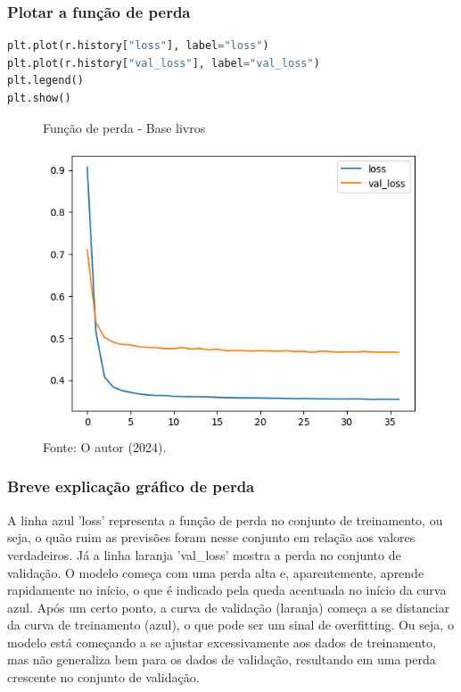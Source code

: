 \subsubsection*{Plotar a função de perda}
\begin{lstlisting}[language=Python, style=input]
plt.plot(r.history["loss"], label="loss")
plt.plot(r.history["val_loss"], label="val_loss")
plt.legend()
plt.show()
\end{lstlisting}
\begin{figure}[H]
\centering
\caption{Função de perda - Base livros}
\includegraphics[width=.8\linewidth]{apendices/fig/13_IAA012_9.png}
\caption*{Fonte: O autor (2024).}
\end{figure}
\subsubsection*{Breve explicação gráfico de perda}
A linha azul 'loss' representa a função de perda no conjunto de treinamento, ou seja, o quão ruim as previsões foram nesse conjunto em relação aos valores verdadeiros. Já a linha laranja 'val\_loss' mostra a perda no conjunto de validação. O modelo começa com uma perda alta e, aparentemente, aprende rapidamente no início, o que é indicado pela queda acentuada no início da curva azul. Após um certo ponto, a curva de validação (laranja) começa a se distanciar da curva de treinamento (azul), o que pode ser um sinal de overfitting. Ou seja, o modelo está começando a se ajustar excessivamente aos dados de treinamento, mas não generaliza bem para os dados de validação, resultando em uma perda crescente no conjunto de validação.

